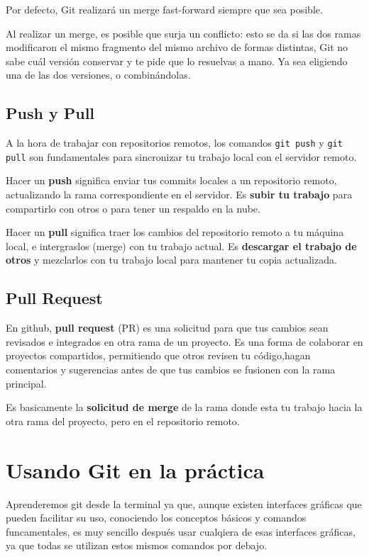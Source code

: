 \documentclass{apuntes_itsv}
\begin{document}
Por defecto, Git realizará un merge fast-forward siempre que sea posible.

Al realizar un merge, es posible que surja un conflicto: esto se da si las dos ramas modificaron
el mismo fragmento del mismo archivo de formas distintas, Git no sabe cuál versión conservar y te
pide que lo resuelvas a mano. Ya sea eligiendo una de las dos versiones, o combinándolas.

\section{Push y Pull}

A la hora de trabajar con repositorios remotos, los comandos \texttt{git push} y \texttt{git pull} son fundamentales
para sincronizar tu trabajo local con el servidor remoto.

Hacer un \textbf{push} significa enviar tus commits locales a un repositorio remoto, actualizando la rama correspondiente
en el servidor. Es \textbf{subir tu trabajo} para compartirlo con otros o para tener un respaldo en la nube.

Hacer un \textbf{pull} significa traer los cambios del repositorio remoto a tu máquina local, e intergraslos (merge) con
tu trabajo actual. Es \textbf{descargar el trabajo de otros} y mezclarlos con tu trabajo local para mantener tu copia actualizada.

\section{Pull Request}
En github, \textbf{pull request} (PR) es una solicitud para que tus cambios sean revisados e integrados en otra rama de un proyecto.
Es una forma de colaborar en proyectos compartidos, permitiendo que otros revisen tu código,hagan comentarios y sugerencias antes de
que tus cambios se fusionen con la rama principal.

Es basicamente la \textbf{solicitud de merge} de la rama donde esta tu trabajo hacia la otra rama del proyecto, pero en el repositorio remoto.

\chapter{Usando Git en la práctica}
Aprenderemos git desde la terminal ya que, aunque existen interfaces gráficas que pueden facilitar su uso, conociendo los conceptos
básicos y comandos funcamentales, es muy sencillo después usar cualqiera de esas interfaces gráficas, ya que todas se utilizan estos
mismos comandos por debajo.
\end{document}
